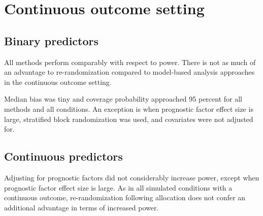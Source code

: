 \section{Continuous outcome setting}
\subsection{Binary predictors}
All methods perform comparably with respect to power. 
There is not as much of an advantage to re-randomization compared to model-based analysis approaches in the continuous outcome setting.

Median bias was tiny and coverage probability approached 95 percent for all methods and all conditions.
An exception is when prognostic factor effect size is large, stratified block randomization was used, and covariates were not adjusted for.

\subsection{Continuous predictors}
Adjusting for prognostic factors did not considerably increase power, except when prognostic factor effect size is large.
As in all simulated conditions with a continuous outcome, re-randomization following allocation does not confer an additional advantage in terms of increased power.